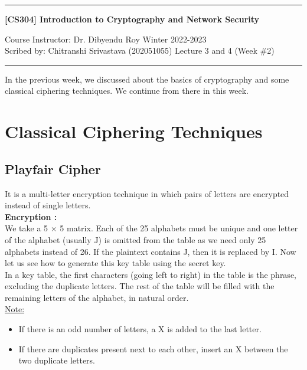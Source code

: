 \documentclass[11pt]{article}
\begin{document}
\noindent
\rule{\textwidth}{1pt}
\begin{center}
{\bf [CS304] Introduction to Cryptography and Network Security}
\end{center}
Course Instructor: Dr. Dibyendu Roy \hfill Winter 2022-2023\\
Scribed by: Chitranshi Srivastava (202051055) \hfill Lecture 3 and 4 (Week \#2)
\\
\rule{\textwidth}{1pt}
In the previous week, we discussed about the basics of cryptography and some classical ciphering techniques. We continue from there in this week.
\section{Classical Ciphering Techniques}
\subsection{Playfair Cipher}
It is a multi-letter encryption technique in which pairs of letters are encrypted instead of single letters.\\
\textbf{Encryption : }\\
We take a 5 $\times$ 5 matrix. Each of the 25 alphabets must be unique and one letter of the alphabet (usually J) is omitted from the table as we need only 25 alphabets instead of 26. If the plaintext contains J, then it is replaced by I. Now let us see how to generate this key table using the secret key.\\


In a key table, the first characters (going left to right) in the table is the phrase, excluding the duplicate letters. The rest of the table will be filled with the remaining letters of the alphabet, in natural order.\\
\underline{Note:}
\begin{itemize}
    \item If there is an odd number of letters, a X is added to the last letter.
    \item If there are duplicates present next to each other, insert an X between the two duplicate letters.
\end{itemize}
\end{document}
